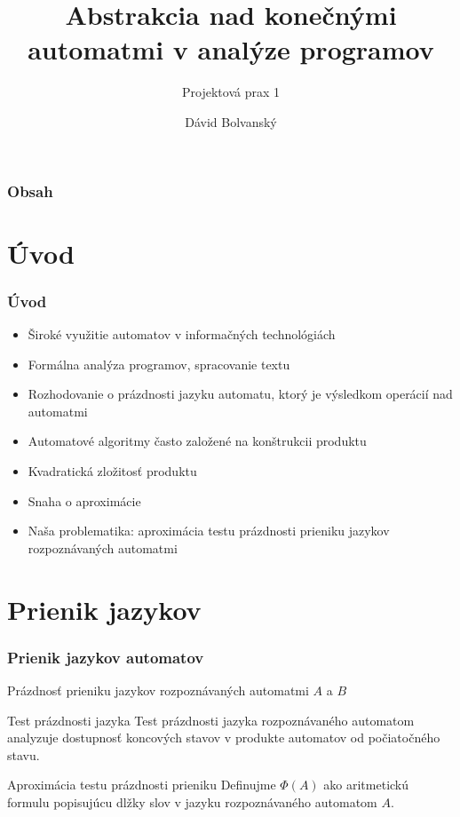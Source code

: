\documentclass[xcolor=dvipsnames]{beamer}
\title{Abstrakcia nad konečnými automatmi v analýze programov}
\subtitle{Projektová prax 1}
\author{Dávid Bolvanský}
\institute{Vysoké učení technické v Brně \\Fakulta informačních technologií}
\begin{document}
 
\frame{\titlepage}

\begin{frame}
\frametitle{Obsah}
\tableofcontents
\end{frame}

\section{Úvod}
 
\begin{frame}
\frametitle{Úvod}
\begin{itemize}
\item Široké využitie automatov v informačných technológiách
\item Formálna analýza programov, spracovanie textu
\item Rozhodovanie o prázdnosti jazyku automatu, ktorý je výsledkom operácií nad automatmi
\item Automatové algoritmy často založené na konštrukcii produktu
\item Kvadratická zložitosť produktu
\item Snaha o aproximácie
\item Naša problematika: aproximácia testu prázdnosti prieniku jazykov rozpoznávaných automatmi

\end{itemize}
\end{frame}

\section{Prienik jazykov}
 
\begin{frame}
\frametitle{Prienik jazykov automatov}
\begin{block}{Prázdnosť prieniku jazykov rozpoznávaných automatmi $A$ a $B$}
\end{block}

\begin{block}{Test prázdnosti jazyka}
Test prázdnosti jazyka rozpoznávaného automatom analyzuje dostupnosť koncových stavov v produkte automatov od počiatočného stavu.
\end{block}


\begin{block}{Aproximácia testu prázdnosti prieniku}
Definujme $\Phi(A)$ ako aritmetickú formulu popisujúcu dlžky slov v jazyku rozpoznávaného automatom $A$.

\end{block}
\end{frame}
\end{document}
